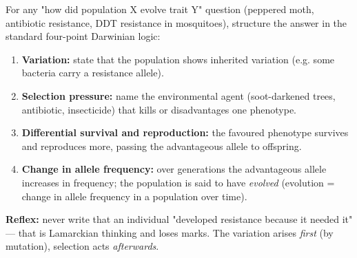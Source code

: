 \documentclass[11pt]{article}
\begin{document}
\begin{methode}
For any "how did population X evolve trait Y" question (peppered moth, antibiotic resistance, DDT resistance in mosquitoes), structure the answer in the standard four-point Darwinian logic:
\begin{enumerate}
\item \textbf{Variation:} state that the population shows inherited variation (e.g. some bacteria carry a resistance allele).
\item \textbf{Selection pressure:} name the environmental agent (soot-darkened trees, antibiotic, insecticide) that kills or disadvantages one phenotype.
\item \textbf{Differential survival and reproduction:} the favoured phenotype survives and reproduces more, passing the advantageous allele to offspring.
\item \textbf{Change in allele frequency:} over generations the advantageous allele increases in frequency; the population is said to have \emph{evolved} (evolution = change in allele frequency in a population over time).
\end{enumerate}
\textbf{Reflex:} never write that an individual "developed resistance because it needed it" — that is Lamarckian thinking and loses marks. The variation arises \emph{first} (by mutation), selection acts \emph{afterwards}.
\end{methode}
\end{document}
